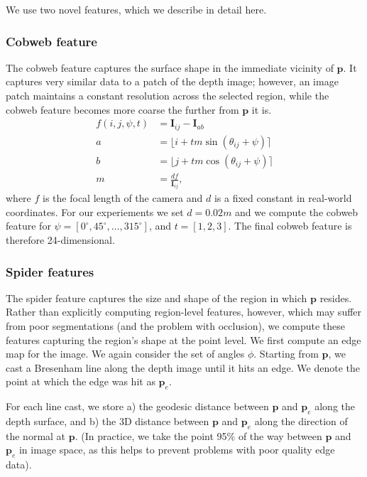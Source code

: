 \documentclass[10pt,twocolumn,letterpaper]{article}
\newcommand{\rgbdimage}{\mathbf{I}}
\newcommand{\point}{\mathbf{p}}
\newcommand{\degree}{^{\circ}}
\begin{document}

We use two novel features, which we describe in detail here.

\subsubsection{Cobweb feature}
The cobweb feature captures the surface shape in the immediate vicinity of $\point$. 
It captures very similar data to a patch of the depth image; however, an image patch maintains a constant resolution across the selected region, while the cobweb feature becomes more coarse the further from $\point$ it is.
\begin{align}
f(i, j, \psi, t) &= \rgbdimage_{ij} - \rgbdimage_{ab} \\
a &= \lfloor i + tm\sin(\theta_{ij}+\psi)\rceil \\
b &= \lfloor j + tm\cos(\theta_{ij}+\psi)\rceil \\
m &= \frac{df}{\rgbdimage_{ij}},
\end{align}
where $f$ is the focal length of the camera and $d$ is a fixed constant in real-world coordinates. For our experiements we set $d=0.02m$ and we compute the cobweb feature for $\psi = [0\degree, 45\degree, \ldots, 315\degree]$, and $t = [1, 2, 3]$. 
The final cobweb feature is therefore 24-dimensional.





\subsubsection{Spider features}
The spider feature captures the size and shape of the region in which $\point$ resides. 
Rather than explicitly computing region-level features, however, which may suffer from poor segmentations (and the problem with occlusion), we compute these features capturing the region's shape at the point level. 
We first compute an edge map for the image.
We again consider the set of angles $\phi$. Starting from $\point$, we cast a Bresenham line along the depth image until it hits an edge. 
We denote the point at which the edge was hit as $\point_{e}$.

For each line cast, we store 
a) the geodesic distance between $\point$ and $\point_{e}$ along the depth surface, and 
b) the 3D distance between $\point$ and $\point_{e}$ along the direction of the normal at $\point$. (In practice, we take the point 95\% of the way between $\point$ and $\point_{e}$ in image space, as this helps to prevent problems with poor quality edge data).
\end{document}
